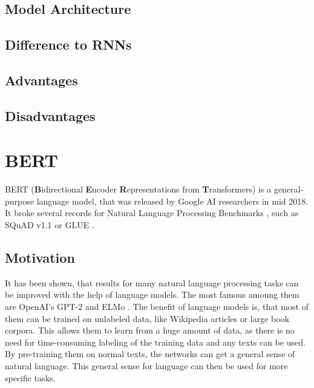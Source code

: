 \subsection{Model Architecture}

\Blindtext

\subsection{Difference to RNNs}

\Blindtext

\subsection{Advantages}

\Blindtext

\subsection{Disadvantages}

\Blindtext


\section{BERT}

BERT (\textbf{B}idirectional \textbf{E}ncoder \textbf{R}epresentations from \textbf{T}ransformers) is a general-purpose language model, that was released by Google AI researchers in mid 2018.
It broke several records for Natural Language Processing Benchmarks \cite[p.~5--7]{devlin2018bert}, such as  SQuAD v1.1 \cite{rajpurkar-etal-2016-squad} or GLUE \cite{1804.07461}.

\subsection{Motivation}

It has been shown, that results for many natural language processing tasks can be improved with the help of language models.
The most famous amoung them are OpenAI's GPT-2 \cite{radford2019language} and ELMo \cite{1802.05365}.
The benefit of language models is, that most of them can be trained on unlabeled data, like Wikipedia articles or large book corpora.
This allows them to learn from a huge amount of data, as there is no need for time-consuming labeling of the training data and any texts can be used.
By pre-training them on normal texts, the networks can get a general sense of natural language.
This general sense for language can then be used for more specific tasks.

